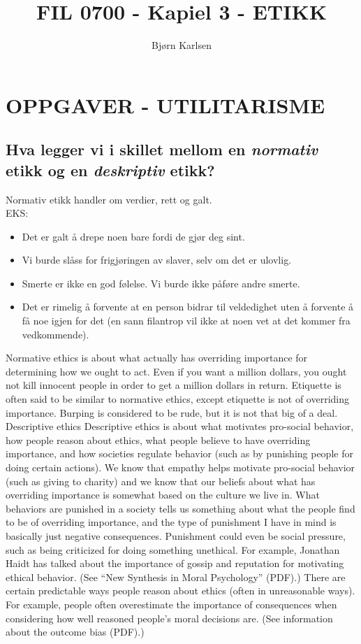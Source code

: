 \documentclass[11pt]{article}
\title{\textbf{FIL 0700 - Kapiel 3 - ETIKK}}
\author{Bjørn Karlsen}
\date{}
\begin{document}
\maketitle

\section{OPPGAVER - UTILITARISME}

\subsection{Hva legger vi i skillet mellom en \emph{normativ} etikk og en \emph{deskriptiv} etikk?}
Normativ etikk handler om verdier, rett og galt.\\
EKS:
\begin{itemize}
\item{Det er galt  å drepe noen bare fordi de gjør deg sint.}
\item{Vi burde slåss for frigjøringen av slaver, selv om det er ulovlig.}
\item{Smerte er ikke en god følelse. Vi burde ikke påføre andre smerte.}
\item{Det er rimelig å forvente at en person bidrar til veldedighet uten å forvente å få noe igjen for det (en sann filantrop vil ikke at noen vet at det kommer fra vedkommende).}
\end{itemize}




Normative ethics is about what actually has overriding importance for determining how we ought to act. Even if you want a million dollars, you ought not kill innocent people in order to get a million dollars in return. Etiquette is often said to be similar to normative ethics, except etiquette is not of overriding importance. Burping is considered to be rude, but it is not that big of a deal.
Descriptive ethics
Descriptive ethics is about what motivates pro-social behavior, how people reason about ethics, what people believe to have overriding importance, and how societies regulate behavior (such as by punishing people for doing certain actions). We know that empathy helps motivate pro-social behavior (such as giving to charity) and we know that our beliefs about what has overriding importance is somewhat based on the culture we live in.
What behaviors are punished in a society tells us something about what the people find to be of overriding importance, and the type of punishment I have in mind is basically just negative consequences. Punishment could even be social pressure, such as being criticized for doing something unethical. For example, Jonathan Haidt has talked about the importance of gossip and reputation for motivating ethical behavior. (See “New Synthesis in Moral Psychology” (PDF).)
There are certain predictable ways people reason about ethics (often in unreasonable ways). For example, people often overestimate the importance of consequences when considering how well reasoned people’s moral decisions are. (See information about the outcome bias (PDF).)
\end{document}
